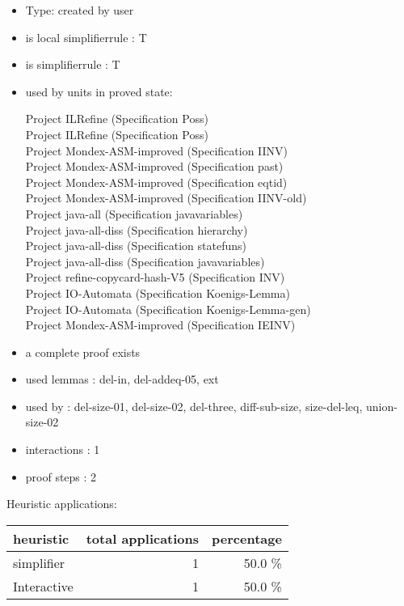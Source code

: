 \documentclass[a4paper]{article}
\begin{document}
\begin{itemize}

\item Type: created by user

\item is local simplifierrule : T
\item is simplifierrule : T
\item used by units in proved state:

Project ILRefine (Specification Poss) \\
Project ILRefine (Specification Poss) \\
Project Mondex-ASM-improved (Specification IINV) \\
Project Mondex-ASM-improved (Specification past) \\
Project Mondex-ASM-improved (Specification eqtid) \\
Project Mondex-ASM-improved (Specification IINV-old) \\
Project java-all (Specification javavariables) \\
Project java-all-diss (Specification hierarchy) \\
Project java-all-diss (Specification statefuns) \\
Project java-all-diss (Specification javavariables) \\
Project refine-copycard-hash-V5 (Specification INV) \\
Project IO-Automata (Specification Koenigs-Lemma) \\
Project IO-Automata (Specification Koenigs-Lemma-gen) \\
Project Mondex-ASM-improved (Specification IEINV)
\item       a complete proof exists
\item       used lemmas  : del-in, del-addeq-05, ext
\item       used by      : del-size-01, del-size-02, del-three, diff-sub-size, size-del-leq, union-size-02
\item       interactions : 1
\item       proof steps  : 2
\end{itemize}

\medskip


Heuristic applications:

\begin{supertabular}{l|r|r}
heuristic	& total applications & percentage \\ \hline
simplifier & 1 & 50.0 \% \\
Interactive & 1 & 50.0 \% \\

\end{supertabular}
\end{document}
